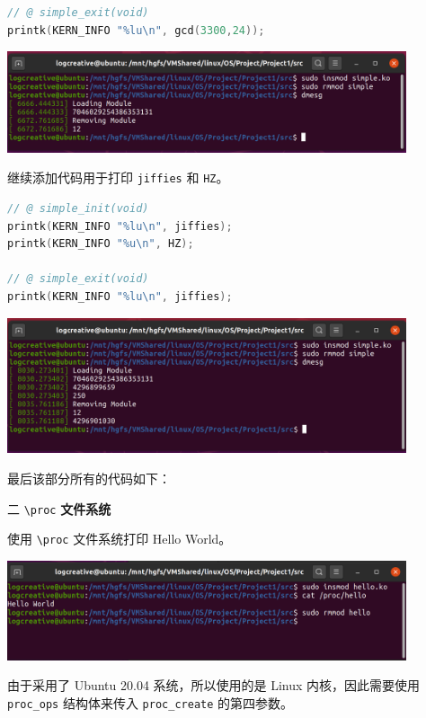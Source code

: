 \documentclass[12pt,a4paper]{article}
\newenvironment{problems}{\begin{list}{}{\renewcommand{\makelabel}[1]{\textbf{##1}\hfil}}}{\end{list}}
\newenvironment{steps}{\begin{list}{}{\renewcommand{\makelabel}[1]{##1.\hfil}}}{\end{list}}
\providecommand{\code}[2]{}
\begin{document}
\begin{problems}
\begin{steps}
\begin{lstlisting}[language=c]
// @ simple_exit(void)
printk(KERN_INFO "%lu\n", gcd(3300,24));
        \end{lstlisting}

        \includegraphics[width=0.88\textwidth]{msimple.png}

        继续添加代码用于打印 \texttt{jiffies} 和 \texttt{HZ}。
        \begin{lstlisting}[language=c]
// @ simple_init(void)
printk(KERN_INFO "%lu\n", jiffies);
printk(KERN_INFO "%u\n", HZ);

// @ simple_exit(void)
printk(KERN_INFO "%lu\n", jiffies);
        \end{lstlisting}

        \includegraphics[width=0.88\textwidth]{jiffies.png}

        最后该部分所有的代码如下：
        \code{src/simple.c}{c}

    \end{steps} 
    \item[二] \verb"\proc" \textbf{文件系统}
    
    使用 \verb"\proc" 文件系统打印 Hello World。

    \includegraphics[width=0.88\textwidth]{hello.png}

    由于采用了 Ubuntu 20.04 系统，所以使用的是 Linux 内核，因此需要使用 \texttt{proc\_ops} 结构体来传入 \texttt{proc\_create} 的第四参数。

    \code{src/hello.c}{c}


\end{problems}
\end{document}
